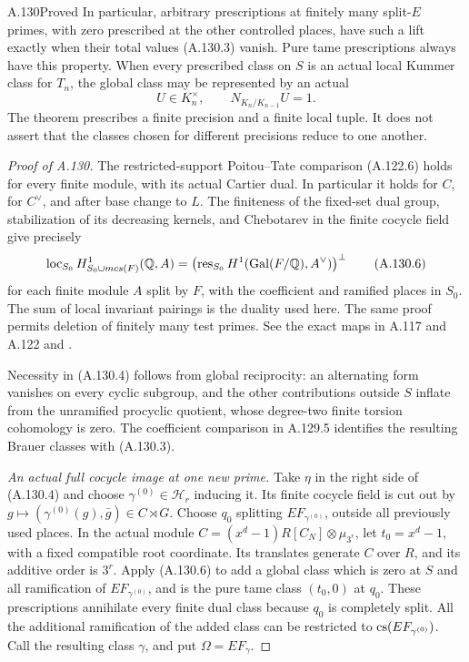 \begin{statement}{A.130}{Proved}
In particular, arbitrary prescriptions at finitely many
split-\(E\) primes, with zero prescribed at the other
controlled places, have such a lift exactly when their
total values (A.130.3) vanish.  Pure tame prescriptions
always have this property.  When every prescribed class
on \(S\) is an actual local Kummer class for \(T_n\), the
global class may be represented by an actual
\[
                 U\in K_n^\times,\qquad
                       N_{K_n/K_{n-1}}U=1.
 \tag{A.130.5}
\]
The theorem prescribes a finite precision and a finite local
tuple.  It does not assert that the classes chosen for
different precisions reduce to one another.
\end{statement}



\begin{proof}[Proof of A.130]
The restricted-support Poitou--Tate comparison (A.122.6)
holds for every finite module, with its actual Cartier dual.
In particular it holds for \(C\), for \(C^\vee\), and after
base change to \(L\).  The finiteness of the fixed-set dual
group, stabilization of its decreasing kernels, and
Chebotarev in the finite cocycle field give precisely
\[
 \operatorname{loc}_{S_0}H^1_{S_0\cup{
m cs}(F)}(\mathbb Q,A)
       =\left(\operatorname{res}_{S_0}
                      H^1(\operatorname{Gal}(F/\mathbb Q),A^\vee)\right)^\perp
 \tag{A.130.6}
\]
for each finite module \(A\) split by \(F\), with the
coefficient and ramified places in \(S_0\).
The sum of local invariant pairings is the duality used
here.  The same proof permits deletion of finitely many
test primes.  See the exact maps in A.117 and A.122 and
\cite[I, Theorem 4.10(b) and Corollary 4.15]{BIR_MilneADT}.

Necessity in (A.130.4) follows from global reciprocity:
an alternating form vanishes on every cyclic subgroup,
and the other contributions outside \(S\) inflate from
the unramified procyclic quotient, whose degree-two
finite torsion cohomology is zero.
The coefficient comparison in A.129.5 identifies the
resulting Brauer classes with (A.130.3).

\emph{An actual full cocycle image at one new prime.}
Take \(\eta\) in the right side of (A.130.4) and choose
\(\gamma^{(0)}\in\mathcal H_r\) inducing it.
Its finite cocycle field is cut out by
\(g\mapsto(\gamma^{(0)}(g),\bar g)\in C\rtimes G\).
Choose \(q_0\) splitting \(EF_{\gamma^{(0)}}\), outside
all previously used places.
In the actual module
\(C=(x^d-1)R[C_N]\otimes\mu_{3^r}\), let
\(t_0=x^d-1\), with a fixed compatible root coordinate.
Its translates generate \(C\) over \(R\), and its
additive order is \(3^r\).
Apply (A.130.6) to add a global class which is zero
at \(S\) and all ramification of \(EF_{\gamma^{(0)}}\),
and is the pure tame class \((t_0,0)\) at \(q_0\).
These prescriptions annihilate every finite dual class
because \(q_0\) is completely split.
All the additional ramification of the added class
can be restricted to \({\rm cs}(EF_{\gamma^{(0)}})\).
Call the resulting class \(\gamma\), and put
\(\Omega=EF_\gamma\).


\end{proof}
